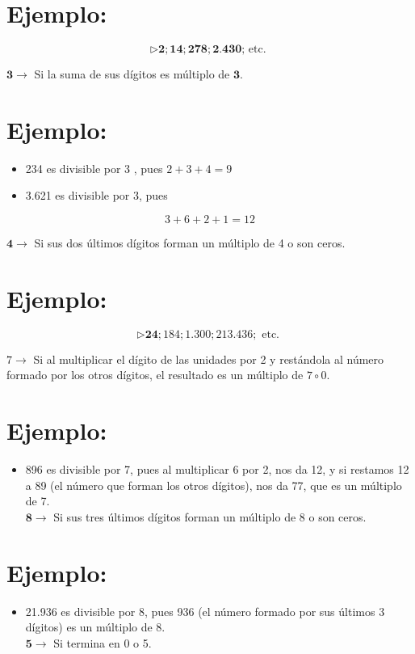 \documentclass[10pt]{article}
\begin{document}
\section*{Ejemplo:}
$$
\triangleright \mathbf{2} ; \mathbf{1 4} ; \mathbf{2 7 8} ; \mathbf{2 . 4 3 0} \text {; etc. }
$$

$\mathbf{3} \rightarrow$ Si la suma de sus dígitos es múltiplo de $\mathbf{3}$.

\section*{Ejemplo:}
\begin{itemize}
  \item 234 es divisible por 3 , pues $2+3+4=9$
  \item 3.621 es divisible por 3, pues
\end{itemize}

$$
3+6+2+1=12
$$

$\mathbf{4} \rightarrow$ Si sus dos últimos dígitos forman un múltiplo de 4 o son ceros.

\section*{Ejemplo:}
$$
\triangleright \mathbf{2 4} ; 184 ; 1.300 ; 213.436 ; \text { etc. }
$$

$7 \rightarrow$ Si al multiplicar el dígito de las unidades por 2 y restándola al número formado por los otros dígitos, el resultado es un múltiplo de $7 \circ 0$.

\section*{Ejemplo:}
\begin{itemize}
  \item 896 es divisible por 7, pues al multiplicar 6 por 2, nos da 12, y si restamos 12 a 89 (el número que forman los otros dígitos), nos da 77, que es un múltiplo de 7.\\
$\mathbf{8} \rightarrow$ Si sus tres últimos dígitos forman un múltiplo de 8 o son ceros.
\end{itemize}

\section*{Ejemplo:}
\begin{itemize}
  \item 21.936 es divisible por 8, pues 936 (el número formado por sus últimos 3 dígitos) es un múltiplo de 8.\\
$\mathbf{5} \rightarrow$ Si termina en 0 o 5.
\end{itemize}
\end{document}
